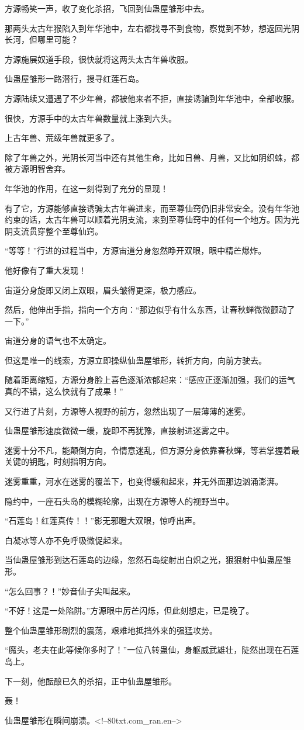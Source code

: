 \begin{this_body}
方源畅笑一声，收了变化杀招，飞回到仙蛊屋雏形中去。

那两头太古年猴陷入到年华池中，左右都找寻不到食物，察觉到不妙，想返回光阴长河，但哪里可能？

方源施展奴道手段，很快就将这两头太古年兽收服。

仙蛊屋雏形一路潜行，搜寻红莲石岛。

方源陆续又遭遇了不少年兽，都被他来者不拒，直接诱骗到年华池中，全部收服。

很快，方源手中的太古年兽数量就上涨到六头。

上古年兽、荒级年兽就更多了。

除了年兽之外，光阴长河当中还有其他生命，比如日兽、月兽，又比如阴织蛛，都被方源明智舍弃。

年华池的作用，在这一刻得到了充分的显现！

有了它，方源能够直接诱骗太古年兽进来，而至尊仙窍仍旧非常安全。没有年华池约束的话，太古年兽可以顺着光阴支流，来到至尊仙窍中的任何一个地方。因为光阴支流贯穿整个至尊仙窍。

“等等！”行进的过程当中，方源宙道分身忽然睁开双眼，眼中精芒爆炸。

他好像有了重大发现！

宙道分身旋即又闭上双眼，眉头皱得更深，极力感应。

然后，他伸出手指，指向一个方向：“那边似乎有什么东西，让春秋蝉微微颤动了一下。”

宙道分身的语气也不太确定。

但这是唯一的线索，方源立即操纵仙蛊屋雏形，转折方向，向前方驶去。

随着距离缩短，方源分身脸上喜色逐渐浓郁起来：“感应正逐渐加强，我们的运气真的不错，这么快就有了成果！”

又行进了片刻，方源等人视野的前方，忽然出现了一层薄薄的迷雾。

仙蛊屋雏形速度微微一缓，旋即不再犹豫，直接射进迷雾之中。

迷雾十分不凡，能颠倒方向，令情意迷乱，但方源分身依靠春秋蝉，等若掌握着最关键的钥匙，时刻指明方向。

迷雾重重，河水在迷雾的覆盖下，也变得缓和起来，并无外面那边汹涌澎湃。

隐约中，一座石头岛的模糊轮廓，出现在方源等人的视野当中。

“石莲岛！红莲真传！！”影无邪瞪大双眼，惊呼出声。

白凝冰等人亦不免呼吸微促起来。

当仙蛊屋雏形到达石莲岛的边缘，忽然石岛绽射出白炽之光，狠狠射中仙蛊屋雏形。

“怎么回事？！”妙音仙子尖叫起来。

“不好！这是一处陷阱。”方源眼中厉芒闪烁，但此刻想走，已是晚了。

整个仙蛊屋雏形剧烈的震荡，艰难地抵挡外来的强猛攻势。

“魔头，老夫在此等候你多时了！”一位八转蛊仙，身躯威武雄壮，陡然出现在石莲岛上。

下一刻，他酝酿已久的杀招，正中仙蛊屋雏形。

轰！

仙蛊屋雏形在瞬间崩溃。<!--80txt.com\_ran.en-->

\end{this_body}

